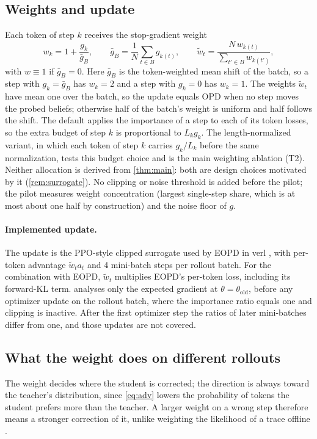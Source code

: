 \documentclass[11pt]{article}
\theoremstyle{definition}
\theoremstyle{remark}
\begin{document}
\subsection{Weights and update}
\label{sec:weights}
Each token of step $k$ receives the stop-gradient weight
\begin{equation}
w_k=1+\frac{g_k}{\bar g_B},\qquad \bar g_B=\frac1N\sum_{t\in B}g_{k(t)},\qquad
\tilde w_t=\frac{N\,w_{k(t)}}{\sum_{t'\in B}w_{k(t')}},
\label{eq:weight}
\end{equation}
with $w\equiv1$ if $\bar g_B=0$. Here $\bar g_B$ is the token-weighted mean shift of the batch, so a step with $g_k=\bar g_B$ has $w_k=2$ and a step with $g_k=0$ has $w_k=1$. The weights $\tilde w_t$ have mean one over the batch, so the update equals OPD when no step moves the probed beliefs; otherwise half of the batch's weight is uniform and half follows the shift. The default applies the importance of a step to each of its token losses, so the extra budget of step $k$ is proportional to $L_k g_k$. The length-normalized variant, in which each token of step $k$ carries $g_k/L_k$ before the same normalization, tests this budget choice and is the main weighting ablation (T2). Neither allocation is derived from \cref{thm:main}: both are design choices motivated by it (\cref{rem:surrogate}). No clipping or noise threshold is added before the pilot; the pilot measures weight concentration (largest single-step share, which is at most about one half by construction) and the noise floor of $g$.

\paragraph{Implemented update.}
The update is the PPO-style clipped surrogate used by EOPD in verl \citep{jin2026eopd}, with per-token advantage $\tilde w_t a_t$ and 4 mini-batch steps per rollout batch. For the combination with EOPD, $\tilde w_t$ multiplies EOPD's per-token loss, including its forward-KL term.  analyses only the expected gradient at $\theta=\theta_{\mathrm{old}}$, before any optimizer update on the rollout batch, where the importance ratio equals one and clipping is inactive. After the first optimizer step the ratios of later mini-batches differ from one, and those updates are not covered.

\subsection{What the weight does on different rollouts}
\label{sec:cases}
The weight decides where the student is corrected; the direction is always toward the teacher's distribution, since \cref{eq:adv} lowers the probability of tokens the student prefers more than the teacher. A larger weight on a wrong step therefore means a stronger correction of it, unlike weighting the likelihood of a trace offline \citep{alerd2026}.
\end{document}
